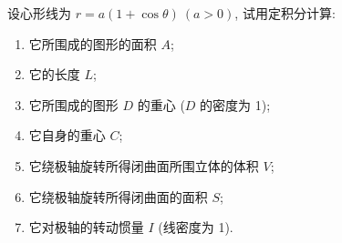 \begin{example}
    设心形线为 $r=a(1+\cos\theta)~ (a>0)$, 试用定积分计算:
    \begin{enumerate}[label=(\arabic{*})]
        \item 它所围成的图形的面积 $A$;
        \item 它的长度 $L$;
        \item 它所围成的图形 $D$ 的重心 ($D$ 的密度为 1);
        \item 它自身的重心 $C$;
        \item 它绕极轴旋转所得闭曲面所围立体的体积 $V$;
        \item 它绕极轴旋转所得闭曲面的面积 $S$;
        \item 它对极轴的转动惯量 $I$ (线密度为 1).
    \end{enumerate}
\end{example}
